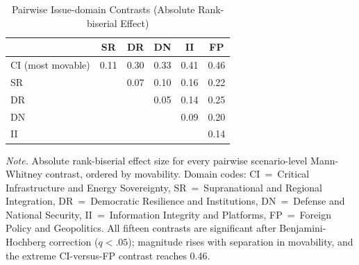 \documentclass[11pt,a4paper]{article}
\newcommand{\floatleft}{\setlength{\parindent}{0pt}\RaggedRight}
\newcommand{\apanote}[1]{\par\vspace{3pt}\begingroup\footnotesize\setstretch{1.06}%
  \textit{Note.} #1\par\endgroup}
\begin{document}
\begin{table}[H]
\floatleft
\caption{Pairwise Issue-domain Contrasts (Absolute Rank-biserial Effect)}
\label{tab:dompairs}
\vspace{2pt}
\begingroup\small
\begin{tabularx}{\linewidth}{@{}Xccccc@{}}
\toprule
 & SR & DR & DN & II & FP \\
\midrule
CI (most movable) & 0.11 & 0.30 & 0.33 & 0.41 & 0.46 \\
SR & & 0.07 & 0.10 & 0.16 & 0.22 \\
DR & & & 0.05 & 0.14 & 0.25 \\
DN & & & & 0.09 & 0.20 \\
II & & & & & 0.14 \\
\bottomrule
\end{tabularx}
\endgroup
\apanote{Absolute rank-biserial effect size for every pairwise scenario-level Mann-Whitney
contrast, ordered by movability. Domain codes: CI~=~Critical Infrastructure and Energy
Sovereignty, SR~=~Supranational and Regional Integration, DR~=~Democratic Resilience and
Institutions, DN~=~Defense and National Security, II~=~Information Integrity and Platforms,
FP~=~Foreign Policy and Geopolitics. All fifteen contrasts are significant after
Benjamini-Hochberg correction ($q<.05$); magnitude rises with separation in movability, and the
extreme CI-versus-FP contrast reaches 0.46.}
\end{table}

\clearpage
\end{document}
